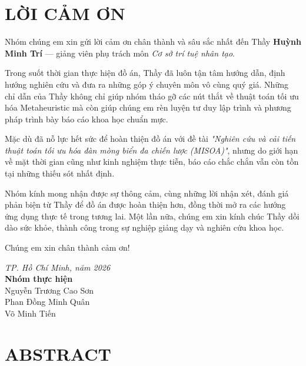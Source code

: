 \documentclass[12pt, a4paper]{article}
\begin{document}
\newpage
{}
\section*{LỜI CẢM ƠN}
Nhóm chúng em xin gửi lời cảm ơn chân thành và sâu sắc nhất đến Thầy \textbf{Huỳnh Minh Trí} — giảng viên phụ trách môn \textit{Cơ sở trí tuệ nhân tạo}.

Trong suốt thời gian thực hiện đồ án, Thầy đã luôn tận tâm hướng dẫn, định hướng nghiên cứu và đưa ra những góp ý chuyên môn vô cùng quý giá. Những chỉ dẫn của Thầy không chỉ giúp nhóm tháo gỡ các nút thắt về thuật toán tối ưu hóa Metaheuristic mà còn giúp chúng em rèn luyện tư duy lập trình và phương pháp trình bày báo cáo khoa học chuẩn mực.

Mặc dù đã nỗ lực hết sức để hoàn thiện đồ án với đề tài \textit{"Nghiên cứu và cải tiến thuật toán tối ưu hóa đàn mòng biển đa chiến lược (MISOA)"}, nhưng do giới hạn về mặt thời gian cũng như kinh nghiệm thực tiễn, báo cáo chắc chắn vẫn còn tồn tại những thiếu sót nhất định.

Nhóm kính mong nhận được sự thông cảm, cùng những lời nhận xét, đánh giá phản biện từ Thầy để đồ án được hoàn thiện hơn, đồng thời mở ra các hướng ứng dụng thực tế trong tương lai. Một lần nữa, chúng em xin kính chúc Thầy dồi dào sức khỏe, thành công trong sự nghiệp giảng dạy và nghiên cứu khoa học.

Chúng em xin chân thành cảm ơn!

\vspace{1cm}
\begin{flushright}
\textit{TP. Hồ Chí Minh, năm 2026} \\
\textbf{Nhóm thực hiện} \\
\vspace{0.2cm}
Nguyễn Trương Cao Sơn \\
Phan Đồng Minh Quân \\
Võ Minh Tiến
\end{flushright}

\newpage
{}
\section*{ABSTRACT}
\end{document}
